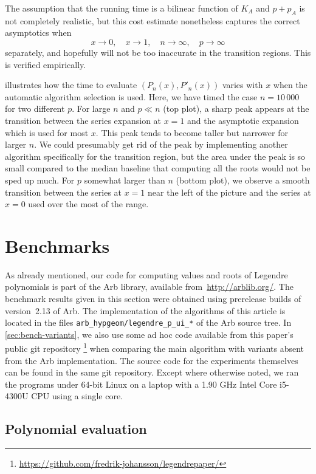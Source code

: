 \documentclass[nohypdvips,review]{siamart0216}
\begin{document}
The assumption that the running time is a bilinear function of $K_A$ and $p + p_A$
is not completely realistic, but this cost estimate nonetheless captures the
correct asymptotics when
$$x \to 0, \quad x \to 1, \quad n \to \infty, \quad p \to \infty$$
separately, and hopefully will not be too inaccurate in the transition regions.
This is verified empirically.

 illustrates how the time to evaluate
$(P_n(x), P'_n(x))$ varies with $x$ when the automatic algorithm selection is used.
Here, we have timed the case $n = 10\,000$ for two different $p$.
For large $n$ and $p \ll n$ (top plot), a sharp peak appears at the transition between the series
expansion at $x = 1$ and the asymptotic expansion which is used for most $x$.
This peak tends to become taller
but narrower for larger $n$.
We could presumably get rid of the peak by implementing another algorithm
specifically for the transition region, but the area under the peak is so small
compared to the median baseline that computing all the roots
would not be sped up much.
For $p$ somewhat larger than $n$ (bottom plot), we observe a smooth transition between the
series at $x = 1$ near the left of the picture and the series at $x = 0$
used over the most of the range.

\section{Benchmarks}

As already mentioned, our code for computing values and roots of
Legendre polynomials is part of the Arb library, available
from~\url{http://arblib.org/}.
The benchmark results given in this section were obtained using
prerelease builds of
version~2.13 of Arb.
The implementation of the algorithms of this article is located in the
files \texttt{arb\_hypgeom/legendre\_p\_ui\_*} of the Arb source tree.
In \cref{sec:bench-variants}, we also use some ad hoc code available
from this paper's public git repository%
\footnote{\url{https://github.com/fredrik-johansson/legendrepaper/}}
when comparing the main algorithm with variants absent from the Arb
implementation.
The source code for the experiments themselves can be found in the same
git repository.
Except where otherwise noted, we ran the programs under 64-bit Linux on a
laptop with a
1.90 GHz Intel Core i5-4300U CPU using a single core.

\label{sec:bench}

\subsection{Polynomial evaluation}
\end{document}
